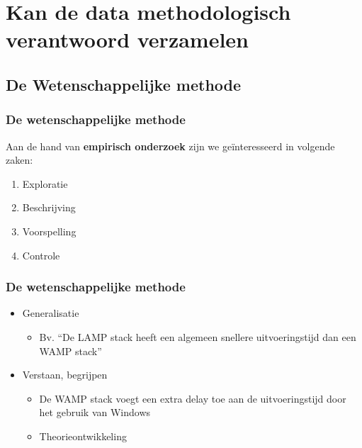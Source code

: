 \documentclass{beamer}
\begin{document}
\section{Kan de data methodologisch verantwoord verzamelen}
\sectionframelogo{}
\subsection{De Wetenschappelijke methode}

\begin{frame}
\end{frame}


\begin{frame}
  \frametitle{De wetenschappelijke methode}

  Aan de hand van \textbf{empirisch onderzoek} zijn we geïnteresseerd in volgende zaken:

  \begin{enumerate}
    \item Exploratie
    \item Beschrijving
    \item Voorspelling
    \item Controle
  \end{enumerate}
\end{frame}

\begin{frame}
  \frametitle{De wetenschappelijke methode}
    \begin{itemize}
      \item Generalisatie
        \begin{itemize}
          \item Bv. ``De LAMP stack heeft een algemeen snellere uitvoeringstijd dan een WAMP stack''
        \end{itemize}
      \item Verstaan, begrijpen
        \begin{itemize}
          \item De WAMP stack voegt een extra delay toe aan de uitvoeringstijd door het gebruik van Windows 
          \item Theorieontwikkeling
        \end{itemize}
    \end{itemize}
\end{frame}
\end{document}
